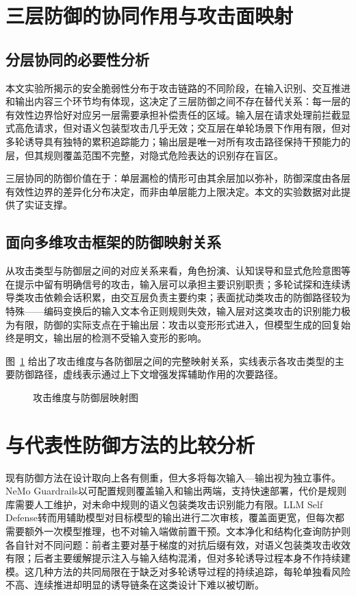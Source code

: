 \section{三层防御的协同作用与攻击面映射}

\subsection{分层协同的必要性分析}

本文实验所揭示的安全脆弱性分布于攻击链路的不同阶段，在输入识别、交互推进和输出内容三个环节均有体现，这决定了三层防御之间不存在替代关系：每一层的有效性边界恰好对应另一层需要承担补偿责任的区域。输入层在请求处理前拦截显式高危请求，但对语义包装型攻击几乎无效；交互层在单轮场景下作用有限，但对多轮诱导具有独特的累积追踪能力；输出层是唯一对所有攻击路径保持干预能力的层，但其规则覆盖范围不完整，对隐式危险表达的识别存在盲区。

三层协同的防御价值在于：单层漏检的情形可由其余层加以弥补，防御深度由各层有效性边界的差异化分布决定，而非由单层能力上限决定。本文的实验数据对此提供了实证支撑。

\subsection{面向多维攻击框架的防御映射关系}

从攻击类型与防御层之间的对应关系来看，角色扮演、认知误导和显式危险意图等在提示中留有明确信号的攻击，输入层可以承担主要识别职责；多轮试探和连续诱导类攻击依赖会话积累，由交互层负责主要约束；表面扰动类攻击的防御路径较为特殊——编码变换后的输入文本令正则规则失效，输入层对这类攻击的识别能力极为有限，防御的实际支点在于输出层：攻击以变形形式进入，但模型生成的回复始终是明文，输出层的检测不受输入变形的影响。

图~\ref{fig:chapter5-attack-defense-map} 给出了攻击维度与各防御层之间的完整映射关系，实线表示各攻击类型的主要防御路径，虚线表示通过上下文增强发挥辅助作用的次要路径。

\begin{figure}[H]
\centering
\resizebox{0.98\textwidth}{!}{}
\caption{攻击维度与防御层映射图}
\label{fig:chapter5-attack-defense-map}
\end{figure}

\section{与代表性防御方法的比较分析}

现有防御方法在设计取向上各有侧重，但大多将每次输入—输出视为独立事件。NeMo Guardrails\cite{rebedea2023nemo}以可配置规则覆盖输入和输出两端，支持快速部署，代价是规则库需要人工维护，对未命中规则的语义包装类攻击识别能力有限。LLM Self Defense\cite{phute2024llmselfdefense}转而用辅助模型对目标模型的输出进行二次审核，覆盖面更宽，但每次都需要额外一次模型推理，也不对输入端做前置干预。文本净化\cite{li2023textpurification}和结构化查询防护\cite{chen2024struq}则各自针对不同问题：前者主要对基于梯度的对抗后缀有效，对语义包装类攻击收效有限；后者主要缓解提示注入与输入结构混淆，但对多轮诱导过程本身不作持续建模。这几种方法的共同局限在于缺乏对多轮诱导过程的持续追踪，每轮单独看风险不高、连续推进却明显的诱导链条在这类设计下难以被切断。

